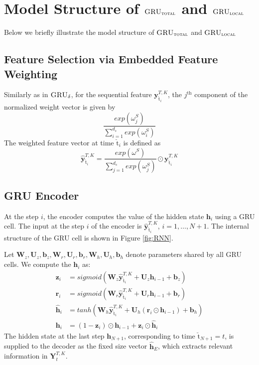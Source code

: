 \documentclass[letterpaper,12pt,titlepage,oneside,final]{book}
\numberwithin{equation}{section}
\theoremstyle{definition}
\newcommand{\model}{\textsc{GRU}_\delta}
\newcommand{\modelT}{\textsc{GRU}_{\textsc{total}}}
\newcommand{\modelL}{\textsc{GRU}_{\textsc{local}}}
\newcommand{\vb}{\mathbf{b}}
\newcommand{\vy}{\mathbf{y}}
\newcommand{\vh}{\mathbf{h}}
\newcommand{\vW}{\pmb{W}}
\newcommand{\vU}{\pmb{U}}
\newcommand{\nt}{\breve{\text{t}}}
\begin{document}
\chapter{Model Structure of $\modelT$ and  $\modelL$}
\label{App:modelstructure}
Below we briefly illustrate the model structure of $\modelT$ and $\modelL$
\section{Feature Selection via Embedded Feature Weighting}
Similarly as in $\model$, for the sequential feature $\mathbf{y}_{\nt_i}^{T,K}$,  the $j^\text{th}$ component of the normalized weight vector is given by
\[
\frac{exp(\omega^S_j)}{\sum_{i=1}^{d_s} exp(\omega^S_i)}
\]
The weighted feature vector at time  $\nt_i$ is defined as
\[
\widehat{\vy}_{\nt_i}^{T,K} =\frac{exp(\omega^S)}{\sum_{j=1}^{d_s} exp(\omega^S_j)} \odot \mathbf{y}_{\nt_i}^{T,K}
\]
\section{GRU Encoder}
At the  step $i$,  the encoder computes the value of the hidden state $\vh_{i}$ using a GRU cell. The input at the step $i$ of the encoder is $\widehat{\vy}^{T,K}_{\nt_{i}}$,  $i=1,\ldots,N+1$.
The internal structure of the GRU cell is shown in Figure \ref{fig:RNN}.

Let  $\vW_z,\vU_z,\vb_z,\vW_r,\vU_r, \vb_r,\vW_h,\vU_h,\vb_h$  denote
parameters shared by all GRU cells. We compute the $\vh_i$ as:
	\[
	\begin{split}
	\mathbf{z}_i&= sigmoid ( \vW_z \widehat{\vy}^{T,K}_{\nt_{i}} + \vU_z \vh_{i-1} +\vb_z)\\
	\mathbf{r}_i&= sigmoid ( \vW_r \widehat{\vy}^{T,K}_{\nt_{i}} + \vU_r \vh_{i-1} +\vb_r)\\
	\widehat{\vh}_i&=tanh( \vW_h \widehat{\vy}^{T,K}_{\nt_{i}}  + \vU_h (\mathbf{r}_i \odot \vh_{i-1}) +\vb_h)\\
	\vh_i&=(1-\mathbf{z}_i) \odot \vh_{i-1} + \mathbf{z}_i \odot \widehat{\vh}_i
	\end{split}
	\]
The hidden state at the last step $\vh_{N+1}$, corresponding to time ${\nt_{N+1}}={t}$, is supplied to
the decoder as the fixed size vector $\mathbf{\widehat{h}}_E$, which  extracts relevant information in $\mathbf{Y}_{t}^{T,K}$.
\end{document}
